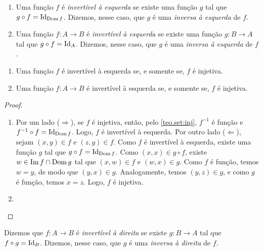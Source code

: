 \begin{definition}
    \leavevmode
        \begin{enumerate}[leftmargin=*, align=left, label=\textbf{(\alph*)}]
            \item Uma função $f$ é \emph{invertível à esquerda} se existe uma função $g$ tal que $g \circ f = \operatorname{Id}_{\operatorname{Dom} f}$. Dizemos, nesse caso, que $g$ é uma \emph{inversa à esquerda} de $f$.
            \item Uma função $f : A \to B$ é \emph{invertível à esquerda} se existe uma função $g : B \to A$ tal que $g \circ f = \operatorname{Id}_A$. Dizemos, nesse caso, que $g$ é uma \emph{inversa à esquerda} de $f$.
        \end{enumerate}
\end{definition}

\begin{theorem} \label{teo.set:invesquerda}
    \leavevmode
        \begin{enumerate}[leftmargin=*, align=left, label=\textbf{(\alph*)}]
            \item Uma função $f$ é invertível à esquerda se, e somente se, $f$ é injetiva.
            \item Uma função $f : A \to B$ é invertível à esquerda se, e somente se, $f$ é injetiva.
        \end{enumerate}
\end{theorem}

\begin{proof}
    \leavevmode
        \begin{enumerate}[leftmargin=*, align=left, label=\textbf{(\alph*)}]
            \item Por um lado ($\Rightarrow$), se $f$ é injetiva, então, pelo \cref{teo.set:inj}, $f^{-1}$ é função e $f^{-1} \circ f = \operatorname{Id}_{\operatorname{Dom} f}$. Logo, $f$ é invertível à esquerda. Por outro lado ($\Leftarrow$), sejam $(x,y) \in f$ e $(z,y) \in f$. Como $f$ é invertível à esquerda, existe uma função $g$ tal que $g \circ f = \operatorname{Id}_{\operatorname{Dom} f}$. Como $(x,x) \in g \circ f$, existe $w \in \operatorname{Im} f \cap \operatorname{Dom} g$ tal que $(x,w) \in f$ e $(w,x) \in g$. Como $f$ é função, temos $w=y$, de modo que $(y,x) \in g$. Analogamente, temos $(y,z) \in g$, e como $g$ é função, temos $x=z$. Logo, $f$ é injetiva. \blackproof
            \item 
        \end{enumerate}
\end{proof}

\begin{definition}
    Dizemos que $f:A \to B$ é \emph{invertível à direita} se existe $g : B \to A$ tal que $f \circ g = \operatorname{Id}_{B}$. Dizemos, nesse caso, que $g$ é uma \emph{inversa à direita} de $f$.
\end{definition}

